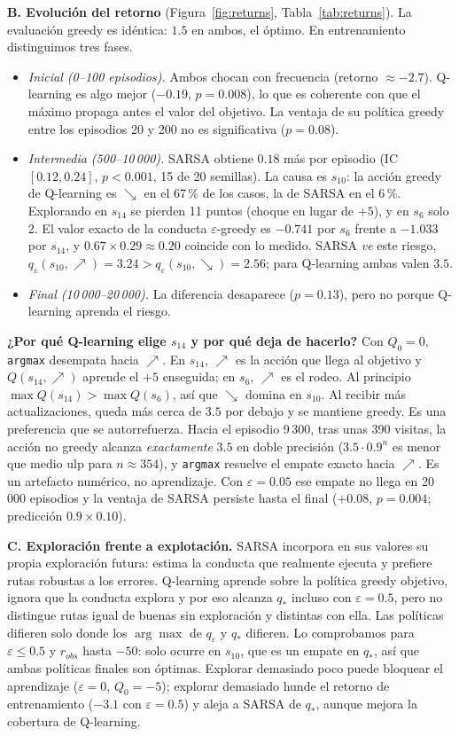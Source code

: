\documentclass[11pt,a4paper]{article}
\newcommand{\UR}{{\nearrow}}
\newcommand{\DR}{{\searrow}}
\newcommand{\qe}{q_\varepsilon}
\begin{document}
\textbf{B. Evolución del retorno} (Figura~\ref{fig:returns}, Tabla~\ref{tab:returns}). La evaluación greedy es idéntica: $1.5$ en ambos, el óptimo. En entrenamiento distinguimos tres fases.
\begin{itemize}\itemsep0pt
\item \emph{Inicial (0--100 episodios).} Ambos chocan con frecuencia (retorno $\approx-2.7$). Q-learning es algo mejor ($-0.19$, $p=0.008$), lo que es coherente con que el máximo propaga antes el valor del objetivo. La ventaja de su política greedy entre los episodios 20 y 200 no es significativa ($p=0.08$).
\item \emph{Intermedia (500--10\,000).} SARSA obtiene $0.18$ más por episodio (IC $[0.12,0.24]$, $p<0.001$, 15 de 20 semillas). La causa es $s_{10}$: la acción greedy de Q-learning es $\DR$ en el 67\,\% de los casos, la de SARSA en el 6\,\%. Explorando en $s_{14}$ se pierden 11 puntos (choque en lugar de $+5$), y en $s_6$ solo 2. El valor exacto de la conducta $\varepsilon$-greedy es $-0.741$ por $s_6$ frente a $-1.033$ por $s_{14}$, y $0.67\times0.29\approx0.20$ coincide con lo medido. SARSA \emph{ve} este riesgo, $\qe(s_{10},\UR)=3.24>\qe(s_{10},\DR)=2.56$; para Q-learning ambas valen $3.5$.
\item \emph{Final (10\,000--20\,000).} La diferencia desaparece ($p=0.13$), pero no porque Q-learning aprenda el riesgo.
\end{itemize}

\textbf{¿Por qué Q-learning elige $s_{14}$ y por qué deja de hacerlo?} Con $Q_0=0$, \texttt{argmax} desempata hacia $\UR$. En $s_{14}$, $\UR$ es la acción que llega al objetivo y $Q(s_{14},\UR)$ aprende el $+5$ enseguida; en $s_6$, $\UR$ es el rodeo. Al principio $\max Q(s_{14})>\max Q(s_6)$, así que $\DR$ domina en $s_{10}$. Al recibir más actualizaciones, queda más cerca de $3.5$ por debajo y se mantiene greedy. Es una preferencia que se autorrefuerza. Hacia el episodio 9\,300, tras unas 390 visitas, la acción no greedy alcanza \emph{exactamente} $3.5$ en doble precisión ($3.5\cdot0.9^n$ es menor que medio ulp para $n\approx354$), y \texttt{argmax} resuelve el empate exacto hacia $\UR$. Es un artefacto numérico, no aprendizaje. Con $\varepsilon=0.05$ ese empate no llega en 20\,000 episodios y la ventaja de SARSA persiste hasta el final ($+0.08$, $p=0.004$; predicción $0.9\times0.10$).

\textbf{C. Exploración frente a explotación.} SARSA incorpora en sus valores su propia exploración futura: estima la conducta que realmente ejecuta y prefiere rutas robustas a los errores. Q-learning aprende sobre la política greedy objetivo, ignora que la conducta explora y por eso alcanza $q_*$ incluso con $\varepsilon=0.5$, pero no distingue rutas igual de buenas sin exploración y distintas con ella. Las políticas difieren solo donde los $\arg\max$ de $\qe$ y $q_*$ difieren. Lo comprobamos para $\varepsilon\le0.5$ y $r_{obs}$ hasta $-50$: solo ocurre en $s_{10}$, que es un empate en $q_*$, así que ambas políticas finales son óptimas. Explorar demasiado poco puede bloquear el aprendizaje ($\varepsilon=0$, $Q_0=-5$); explorar demasiado hunde el retorno de entrenamiento ($-3.1$ con $\varepsilon=0.5$) y aleja a SARSA de $q_*$, aunque mejora la cobertura de Q-learning.
\end{document}
